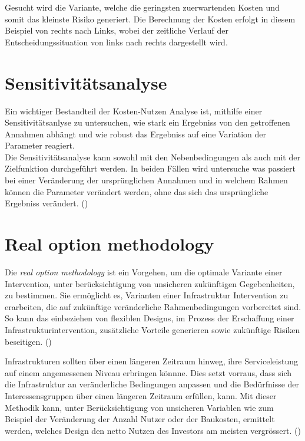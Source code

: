 Gesucht wird die Variante, welche die geringsten zuerwartenden Kosten und somit das kleinste Risiko generiert. Die Berechnung der Kosten erfolgt in diesem Beispiel von rechts nach Links, wobei der zeitliche Verlauf der Entscheidungssituation von links nach rechts dargestellt wird. 

\section{Sensitivitätsanalyse}
\label{sec:Sensitivität}

Ein wichtiger Bestandteil der Kosten-Nutzen Analyse ist, mithilfe einer Sensitivitätsanlyse zu untersuchen, wie stark ein Ergebniss von den getroffenen Annahmen abhängt und wie robust das Ergebniss auf eine Variation der Parameter reagiert. \\
Die Sensitivitätsanalyse kann sowohl mit den Nebenbedingungen als auch mit der Zielfunktion durchgeführt werden. In beiden Fällen wird untersuche was passiert bei einer Veränderung der ursprünglichen Annahmen und in welchem Rahmen können die Parameter verändert werden, ohne das sich das ursprüngliche Ergebniss verändert.  (\cite{Adey2019})

\pagebreak
 
\section{Real option methodology}
\label{sec:RealOption}

Die \textit{real option methodology} ist ein Vorgehen, um die optimale Variante einer Intervention, unter berücksichtigung von unsicheren zukünftigen Gegebenheiten, zu bestimmen. 
Sie ermöglicht es, Varianten einer Infrastruktur Intervention zu erarbeiten, die auf zukünftige veränderliche Rahmenbedingungen vorbereitet sind. So kann das einbeziehen von flexiblen Designs, im Prozess der Erschaffung einer Infrastrukturintervention, zusätzliche Vorteile generieren sowie zukünftige Risiken beseitigen. (\cite{Neufville2011})

Infrastrukturen sollten über einen längeren Zeitraum hinweg, ihre Serviceleistung auf einem angemessenen Niveau erbringen könnne. Dies setzt vorraus, dass sich die Infrastruktur an veränderliche Bedingungen anpassen und die Bedürfnisse der Interessensgruppen über einen längeren Zeitraum erfüllen, kann. 
Mit dieser Methodik kann, unter Berücksichtigung von unsicheren Variablen wie zum Beispiel der Veränderung der Anzahl Nutzer oder der Baukosten, ermittelt werden, welches Design den netto Nutzen des Investors am meisten vergrössert. (\cite{Esders2015}) \cite{Martani2018}




%

